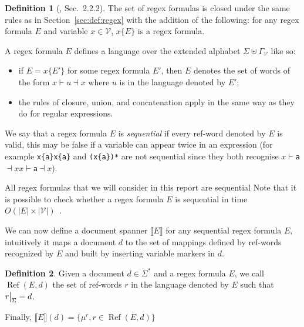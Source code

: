 \documentclass[11px]{article}
\theoremstyle{definition}
\newtheorem{definition}{Definition}
\DeclareMathOperator{\Ref}{Ref}
\newcommand\restr[2]{{%
  \left.\kern-\nulldelimiterspace %
  #1 %
  \vphantom{\big|} %
  \right|_{#2} %
  }}
\begin{document}
        \begin{definition}[\cite{peterfreund}, Sec.\ 2.2.2]
          The set of regex formulas is closed under the same rules as in
          Section~\ref{sec:def:regex} with the addition of the following: for
          any regex formula $E$ and variable $x \in \mathcal{V}$, $x\{E\}$ is a
          regex formula.

          A regex formula $E$ defines a language over the extended alphabet
          $\Sigma \uplus \Gamma_\mathcal{V}$ like so:
            \begin{itemize}
              \item if $E = x\{E'\}$ for some regex formula $E'$, then $E$ denotes
                the set of words of the form $x{\vdash} u {\dashv}x$ where $u$ is
                in the language denoted by $E'$;
              \item the rules of closure, union, and concatenation apply in the same
                way as they do for regular expressions.
            \end{itemize}

          We say that a regex formula $E$ is \textit{sequential} if every
          ref-word denoted by $E$ is valid, this may be false if a variable can
          appear twice in an expression (for example \texttt{x\{a\}x\{a\}} and
          \texttt{(x\{a\})*} are not sequential since they both recognise
          \texttt{$x{\vdash}$a${\dashv}x$$x{\vdash}$a${\dashv}x$}).
        \end{definition}

        All regex formulas that we will consider in this report are sequential
        Note that it is possible to check whether a regex formula $E$ is
        sequential in time $O(|E| \times |\mathcal{V}|)$~\cite{peterfreund}.

        We can now define a document spanner $\llbracket E \rrbracket$ for any
        sequential regex formula $E$, intuitively it maps a document $d$ to the
        set of mappings defined by ref-words recognized by $E$ and built by
        inserting variable markers in $d$.

        \begin{definition}
          Given a document $d \in \Sigma^*$ and a regex formula $E$, we call
          $\Ref(E, d)$ the set of ref-words $r$ in the language denoted by $E$
          such that $\restr{r}{\Sigma} = d$.

          Finally, $\llbracket E \rrbracket (d) = \{\mu^r, r \in \Ref(E, d)\}$
        \end{definition}
\end{document}
